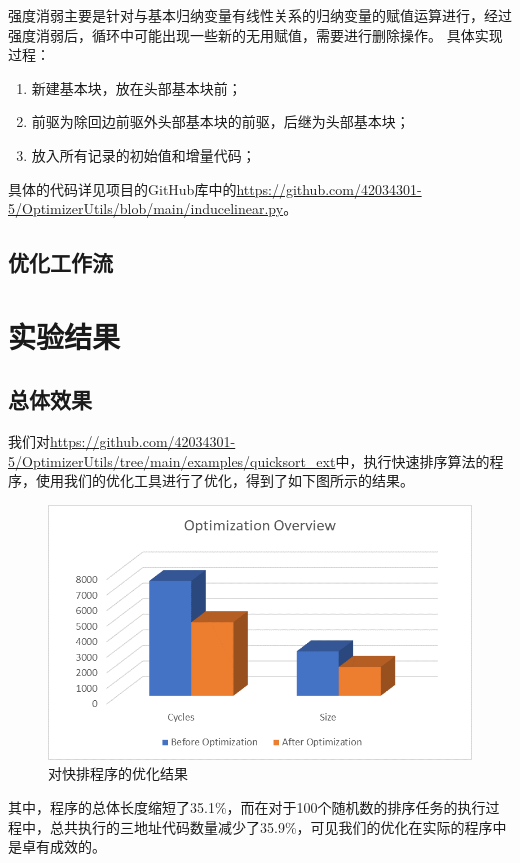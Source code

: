\documentclass[cn,black,11pt,normal]{elegantnote}
\begin{document}
强度消弱主要是针对与基本归纳变量有线性关系的归纳变量的赋值运算进行，经过强度消弱后，循环中可能出现一些新的无用赋值，需要进行删除操作。
具体实现过程：

\begin{enumerate}
    \item 新建基本块，放在头部基本块前；
    \item 前驱为除回边前驱外头部基本块的前驱，后继为头部基本块；
    \item 放入所有记录的初始值和增量代码；
\end{enumerate}

具体的代码详见项目的GitHub库中的\url{https://github.com/42034301-5/OptimizerUtils/blob/main/inducelinear.py}。

\subsection{优化工作流}

\section{实验结果}

\subsection{总体效果}

我们对\url{https://github.com/42034301-5/OptimizerUtils/tree/main/examples/quicksort_ext}中，执行快速排序算法的程序，使用我们的优化工具进行了优化，得到了如下图所示的结果。

\begin{figure}[H]
    \centering
    \includegraphics[width=0.8\linewidth]{image/quicksort_opt.png}
    \caption{对快排程序的优化结果}
\end{figure}

其中，程序的总体长度缩短了35.1\%，而在对于100个随机数的排序任务的执行过程中，总共执行的三地址代码数量减少了35.9\%，可见我们的优化在实际的程序中是卓有成效的。
\end{document}
